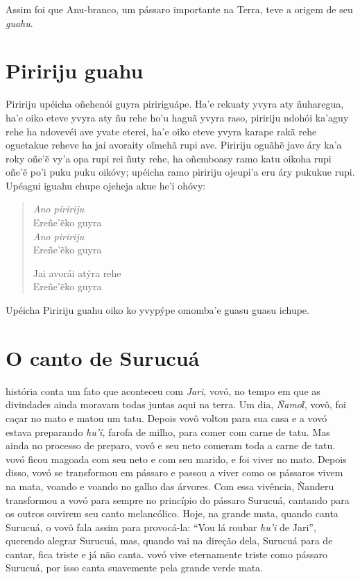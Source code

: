 
Assim foi que Anu-branco, um pássaro importante na Terra, teve a origem
de seu \textit{guahu}.

\chapter{Piririju guahu}

 Piririju upéicha oñehenói guyra piririguápe. Ha'e rekuaty yvyra
aty ñuharegua, ha'e oiko eteve yvyra aty ñu rehe ho'u haguã yvyra raso,
piririju ndohói ka'aguy rehe ha ndovevéi ave yvate eterei, ha'e oiko
eteve yvyra karape rakã rehe oguetakue reheve ha jai avoraity oĩmehã
rupi ave. Piririju oguãhẽ jave áry ka'a roky oñe'ẽ vy'a opa rupi rei
ñuty rehe, ha oñemboasy ramo katu oikoha rupi oñe'ẽ po'i puku puku
oikóvy; upéicha ramo piririju ojeupi'a eru áry pukukue rupi. Upéagui
iguahu chupe ojeheja akue he'i ohóvy:

\begin{verse}
\textit{Ano piririju}\\
Ereñe'ẽko guyra\\
\textit{Ano piririju}\\
Ereñe'ẽko guyra
       
Jai avorái atýra rehe\\
Ereñe'ẽko guyra
\end{verse}

Upéicha Piririju guahu oiko ko yvypýpe omomba'e guasu guasu ichupe.

\chapter{O canto de Surucuá}

 história conta um fato que aconteceu com \textit{Jari}, vovó, no
tempo em que as divindades ainda moravam todas juntas aqui na terra. Um
dia, \textit{Ñamoῖ}, vovô, foi caçar no mato e matou um tatu. Depois vovô
voltou para sua casa e a vovó estava preparando \textit{hu'í,} farofa de
milho, para comer com carne de tatu. Mas ainda no processo de preparo,
vovô e seu neto comeram toda a carne de tatu. vovó ficou magoada com seu
neto e com seu marido, e foi viver no mato. Depois disso, vovó se
transformou em pássaro e passou a viver como os pássaros vivem na mata,
voando e voando no galho das árvores. Com essa vivência, Ñanderu
transformou a vovó para sempre no princípio do pássaro Surucuá, cantando
para os outros ouvirem seu canto melancólico. Hoje, na grande mata,
quando canta Surucuá, o vovô fala assim para provocá-la: ``Vou lá roubar
\textit{hu'i} de Jari'', querendo alegrar Surucuá, mas, quando vai na
direção dela, Surucuá para de cantar, fica triste e já não canta. vovó
vive eternamente triste como pássaro Surucuá, por isso canta suavemente
pela grande verde mata.

